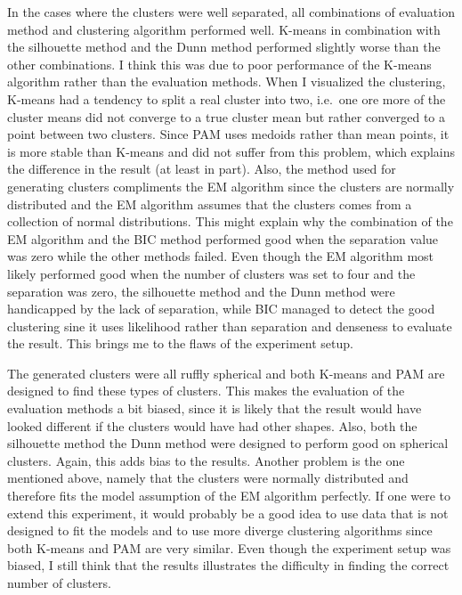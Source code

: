 \documentclass[11pt,twoside,swedish]{article}
\begin{document}
In the cases where the clusters were well separated, all combinations
of evaluation method and clustering algorithm performed
well. K-means in combination with the silhouette method and the Dunn
method performed slightly worse than the other combinations. I think
this was due to poor performance of the K-means algorithm rather than
the evaluation methods. When I visualized the clustering, K-means had
a tendency to split a real cluster into two, i.e.\ one ore more of
the cluster means did not converge to a true cluster mean but rather
converged to a point between two clusters. Since PAM uses medoids
rather than mean points, it is more stable than K-means and did not
suffer from this problem, which explains the difference in the result
(at least in part). Also, the method used for generating clusters
compliments the EM algorithm since the clusters are normally
distributed and the EM algorithm assumes that the clusters comes from
a collection of normal distributions. This might explain why the combination
of the EM algorithm and the BIC method performed good when the
separation value was zero while the other methods failed. Even though
the EM algorithm most likely performed good when the number of
clusters was set to four and the separation was zero, the silhouette
method and the Dunn method were handicapped by the lack of separation,
while BIC managed to detect the good clustering sine it uses
likelihood rather than separation and denseness to evaluate the
result. This brings me to the flaws of the experiment setup.

The generated clusters were all ruffly spherical and both K-means and PAM are
designed to find these types of clusters. This makes the evaluation of
the evaluation methods a bit biased, since it is likely that the
result would have looked different if the clusters would have had
other shapes. Also, both the silhouette method the Dunn method were
designed to perform good on spherical clusters. Again, this adds bias
to the results. Another problem is the one mentioned above, namely
that the clusters were normally distributed and therefore fits the
model assumption of the EM algorithm perfectly. If one were to extend
this experiment, it would probably be a good idea to use data that is
not designed to fit the models and to use more diverge clustering
algorithms since both K-means and PAM are very similar. Even though
the experiment setup was biased, I still think that the  results
illustrates the difficulty in finding the correct number of clusters.
\end{document}
